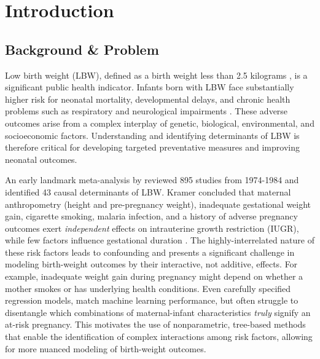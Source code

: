 \chapter{Introduction}
\label{chap:introduction}

\section{Background \& Problem}

Low birth weight (LBW), defined as a birth weight less than 2.5 kilograms \citep{lbw_def, kramer1987}, is a significant public health indicator. Infants born with LBW face substantially higher risk for neonatal mortality, developmental delays, and chronic health problems such as respiratory and neurological impairments \citep{finch2003}. These adverse outcomes arise from a complex interplay of genetic, biological, environmental, and socioeconomic factors. Understanding and identifying determinants of LBW is therefore critical for developing targeted preventative measures and improving neonatal outcomes. 

An early landmark meta-analysis by \citet{kramer1987} reviewed 895 studies from 1974-1984 and identified 43 causal determinants of LBW. Kramer concluded that maternal anthropometry (height and pre-pregnancy weight), inadequate gestational weight gain, cigarette smoking, malaria infection, and a history of adverse pregnancy outcomes exert \emph{independent} effects on intrauterine growth restriction (IUGR), while few factors influence gestational duration \citep{kramer1987}. The highly-interrelated nature of these risk factors leads to confounding and presents a significant challenge in modeling birth-weight outcomes by their interactive, not additive, effects. For example, inadequate weight gain during pregnancy might depend on whether a mother smokes or has underlying health conditions. Even carefully specified regression models, match machine learning performance, but often struggle to disentangle which combinations of maternal-infant characteristics \emph{truly} signify an at-risk pregnancy. This motivates the use of nonparametric, tree-based methods that enable the identification of complex interactions among risk factors, allowing for more nuanced modeling of birth-weight outcomes.

